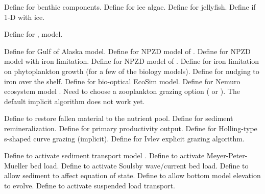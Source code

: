 \begin{klist}
\begin{klist}
\begin{klist}
       Define for benthic components.
       Define for ice algae.
       Define for jellyfish.
       Define if 1-D with ice.
    \end{klist}
     Define for \citet{Xiu_2014},
  \citet{Xiu_2012} model.
    \begin{klist}
    \end{klist}
     Define for
    \citet{Hinckley_2009} Gulf of Alaska model.
     Define for NPZD model of \citet{Franks_86}.
     Define for NPZD model with iron limitation.
     Define for NPZD model of \citet{Powell_2006}.
     Define for iron limitation on phytoplankton
    growth (for a few of the biology models).
     Define for nudging to iron over the shelf.
     Define for bio-optical EcoSim model.
     Define for Nemuro ecosystem model \citep{Kishi_2007}.
    Need to choose a zooplankton grazing option ( or
    ). The default implicit  algorithm
    does not work yet. 
    \begin{klist}
        Define to restore fallen material to the
       nutrient pool.
        Define for sediment remineralization.
        Define for primary productivity output.
        Define for Holling-type s-shaped curve
       grazing (implicit).
        Define for Ivlev explicit grazing
       algorithm.
    \end{klist}
  \end{klist}
   \mbox{}
  \begin{klist}
     Define to activate sediment transport model
    \citep{Warner_2008}.
     Define to activate Meyer-Peter-Mueller bed load.
     Define to activate Soulsby wave/current
    bed load.
     Define to allow sediment to affect equation of
    state.
     Define to allow bottom model elevation to evolve.
     Define to activate suspended load transport.
  \end{klist}
   \mbox{}
  \begin{klist}

\end{klist}
\end{klist}
